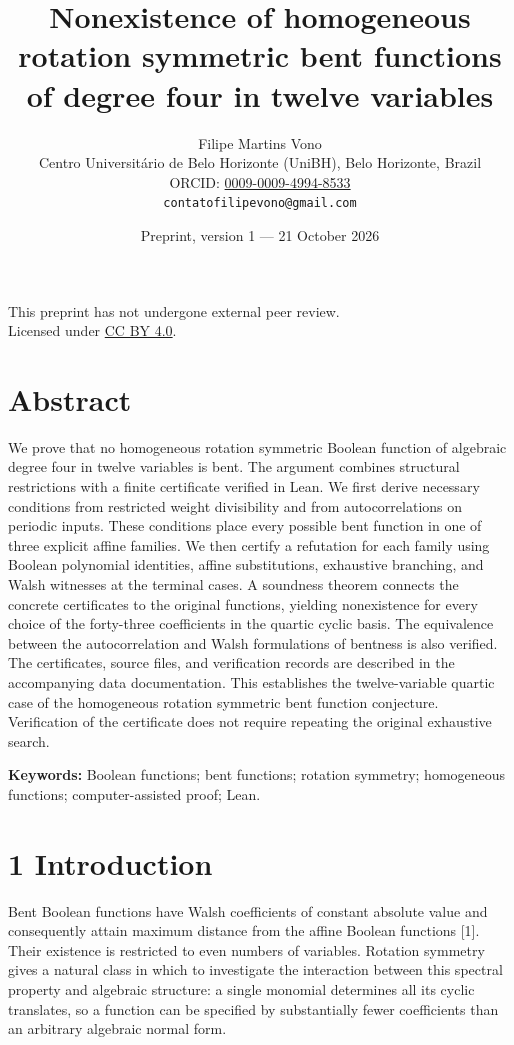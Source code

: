 \documentclass[11pt,a4paper]{article}
\title{Nonexistence of homogeneous rotation symmetric bent functions of degree four in twelve variables}
\author{Filipe Martins Vono\\\small Centro Universit\'ario de Belo Horizonte (UniBH), Belo Horizonte, Brazil\\\small ORCID: \href{https://orcid.org/0009-0009-4994-8533}{0009-0009-4994-8533}\\\small\texttt{contatofilipevono@gmail.com}}
\date{Preprint, version 1 --- 21 October 2026}
\begin{document}
\maketitle
\begin{center}\small This preprint has not undergone external peer review.\\Licensed under \href{https://creativecommons.org/licenses/by/4.0/}{CC BY 4.0}.\end{center}

\section*{Abstract}

We prove that no homogeneous rotation symmetric Boolean function of algebraic degree four in twelve variables is bent. The argument combines structural restrictions with a finite certificate verified in Lean. We first derive necessary conditions from restricted weight divisibility and from autocorrelations on periodic inputs. These conditions place every possible bent function in one of three explicit affine families. We then certify a refutation for each family using Boolean polynomial identities, affine substitutions, exhaustive branching, and Walsh witnesses at the terminal cases. A soundness theorem connects the concrete certificates to the original functions, yielding nonexistence for every choice of the forty-three coefficients in the quartic cyclic basis. The equivalence between the autocorrelation and Walsh formulations of bentness is also verified. The certificates, source files, and verification records are described in the accompanying data documentation. This establishes the twelve-variable quartic case of the homogeneous rotation symmetric bent function conjecture. Verification of the certificate does not require repeating the original exhaustive search.

\textbf{Keywords:} Boolean functions; bent functions; rotation symmetry; homogeneous functions; computer-assisted proof; Lean.

\section*{1 Introduction}

Bent Boolean functions have Walsh coefficients of constant absolute value and consequently attain maximum distance from the affine Boolean functions [1]. Their existence is restricted to even numbers of variables. Rotation symmetry gives a natural class in which to investigate the interaction between this spectral property and algebraic structure: a single monomial determines all its cyclic translates, so a function can be specified by substantially fewer coefficients than an arbitrary algebraic normal form.
\end{document}
